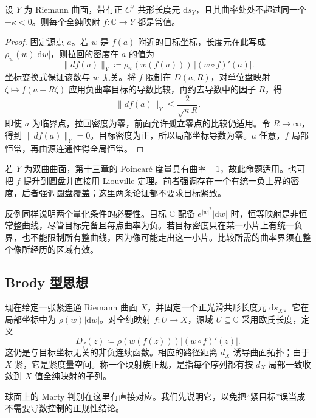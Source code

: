 \begin{proposition}[负曲率目标中的整曲线]\label{b3:prop:14-negative-target-entire}
设 \(Y\) 为 Riemann 曲面，带有正 \(C^2\) 共形长度元 \(\mathrm ds_Y\)，且其曲率处处不超过同一个 \(-\kappa<0\)。则每个全纯映射 \(f:\mathbb C\to Y\) 都是常值。
\end{proposition}
\begin{proof}
固定源点 \(a\)。若 \(w\) 是 \(f(a)\) 附近的目标坐标，长度元在此写成 \(\rho_w(w)|\mathrm dw|\)，则拉回的密度在 \(a\) 的值为
\[
 \|df(a)\|_Y\coloneqq
 \rho_w(w(f(a)))\,|(w\circ f)'(a)|.
\]
坐标变换式保证该数与 \(w\) 无关。将 \(f\) 限制在 \(D(a,R)\)，对单位盘映射 \(\zeta\mapsto f(a+R\zeta)\) 应用负曲率目标的导数比较，再约去导数中的因子 \(R\)，得
\[
 \|df(a)\|_Y\le\frac{2}{\sqrt\kappa R}.
\]
即使 \(a\) 为临界点，拉回密度为零，前面允许孤立零点的比较仍适用。令 \(R\to\infty\)，得到 \(\|df(a)\|_Y=0\)。目标密度为正，所以局部坐标导数为零。\(a\) 任意，\(f\) 局部恒常，再由源连通性得全局恒常。
\end{proof}
若 \(Y\) 为双曲曲面，第十三章的 Poincaré 度量具有曲率 \(-1\)，故此命题适用。也可把 \(f\) 提升到圆盘并直接用 Liouville 定理。前者强调存在一个有统一负上界的密度，后者强调圆盘覆盖；这里两条论证都不要求目标紧致。

\ProseParagraphBreak
反例同样说明两个量化条件的必要性。目标 \(\mathbb C\) 配备 \(e^{|w|^2}|\mathrm dw|\) 时，恒等映射是非恒常整曲线，尽管目标完备且每点曲率为负。若目标密度只在某一小片上有统一负界，也不能限制所有整曲线，因为像可能走出这一小片。比较所需的曲率界须在整个像所经历的区域有效。

\subsection{Brody 型思想}
\label{b3:subsec:140603}

现在给定一张紧连通 Riemann 曲面 \(X\)，并固定一个正光滑共形长度元 \(\mathrm ds_X\)。它在局部坐标中为 \(\rho(w)|\mathrm dw|\)。对全纯映射 \(f:U\to X\)，源域 \(U\subseteq\mathbb C\) 采用欧氏长度，定义
\[
 D_f(z)\coloneqq\rho(w(f(z)))|(w\circ f)'(z)|.
\]
这仍是与目标坐标无关的非负连续函数。相应的路径距离 \(d_X\) 诱导曲面拓扑；由于 \(X\) 紧，它是紧度量空间。称一个映射族正规，是指每个序列都有按 \(d_X\) 局部一致收敛到 \(X\) 值全纯映射的子列。

\ProseParagraphBreak
球面上的 Marty 判别在这里有直接对应。我们先说明它，以免把“紧目标”误当成不需要导数控制的正规性结论。

